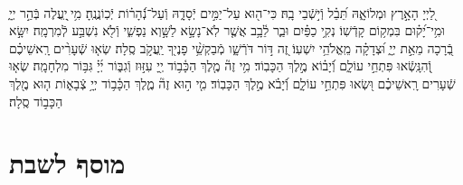 \documentclass[twoside, openany, parskip=half, 11pt]{book}
\begin{document}
\begin{sometimes}

\\
%
לַ֭יְיָ הָאָ֣רֶץ וּמְלוֹאָ֑הּ תֵּ֝בֵ֗ל וְֿי֣שְֿׁבֵי בָֽהּ׃
כִּי־ה֖וּא עַל־יַמִּ֣ים יְֿסָדָ֑הּ וְֿעַל־נְֿ֝הָר֗וֹת יְֿכֽוֹנֲנֶֽהָ׃
מִ֥י ֖יַֽעֲלֶה בְּֿהַ֣ר יְיָ֑ וּמִ֥י־יָ֝ק֗וּם בִּמְק֥וֹם קָדְֿשֽׁוֹ׃
נְקִ֥י כַפַּ֗יִם וּבַ֢ר לֵ֫בָ֥ב אֲשֶׁ֤ר לֹֽא־נָשָׂ֣א לַשָּׁ֣וְא נַפְשִׁ֑י וְֿלֹ֖א נִשְׁבַּ֣ע לְֿמִרְמָֽה׃
יִשָּׂ֣א בְֿ֭רָכָה מֵאֵ֣ת יְיָ֑ וּ֝צְדָקָ֗ה מֵֽאֱלֹהֵ֥י יִשְׁעֽוֹ׃
זֶ֭ה דּ֣וֹר דֹּרְֿשָׁ֑ו מְֿבַקְשֵׁ֥֨י פָנֶי֖ךָ יַֽעֲקֹ֣ב סֶֽלָה׃
שְׂא֤וּ שְֿׁעָרִ֨ים רָֽאשֵׁיכֶ֗ם וְֿ֭הִנָּֽשְֿׂאוּ פִּתְחֵ֣י עוֹלָ֑ם וְֿ֝יָב֗וֹא מֶ֣לֶךְ הַכָּבֽוֹד׃
מִ֥י זֶה֘ מֶ֤לֶךְ הַכָּ֫ב֥וֹד יְ֖יָ עִזּ֣וּז וְֿגִבּ֑וֹר יְ֜יָ֗ גִּבּ֥וֹר מִלְחָמָֽה׃
שְׂא֤וּ שְֿׁעָרִים רָֽאשֵׁיכֶ֗ם וּ֭שְׂאוּ פִּתְחֵ֣י עוֹלָ֑ם וְֿ֝יָבֹ֗א מֶ֣לֶךְ הַכָּבֽוֹד׃
מִ֤י ה֣וּא זֶה֘ מֶ֢לֶךְ הַכָּ֫ב֥וֹד יְיָ֥ צְֿבָא֑וֹת ה֤וּא מֶ֖לֶךְ הַכָּב֣וֹד סֶֽלָה׃

\end{sometimes}



\etzchaim

\halfkaddish


\vspace{\baselineskip}


{\let\clearpage\relax
\chapter[מוסף לשבת]{ מוסף לשבת }}

\amidaopening{\shabbosshuva}{}

\end{document}
